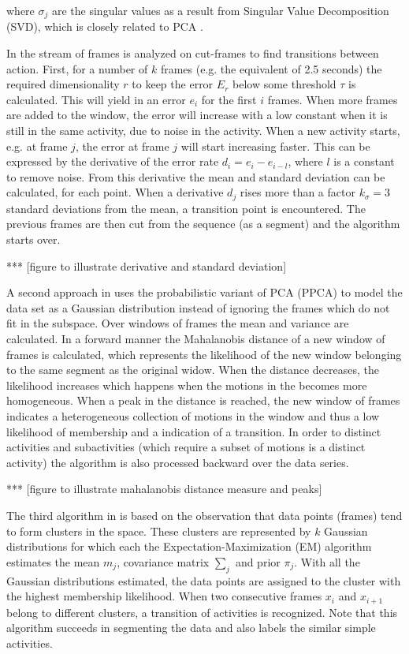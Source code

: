 where $\sigma_j$ are the singular values as a result from Singular Value 
Decomposition (SVD), which is closely related to PCA \cite{shlens2005tutorial}.

In \cite{barbivc2004segmenting} the stream of frames is analyzed on cut-frames 
to find transitions between action. First, for a number of $k$ frames (e.g. 
the 
equivalent of 2.5 seconds) the required dimensionality $r$ to keep the error 
$E_r$ 
below some threshold $\tau$ is calculated. This will yield in an error $e_i$ 
for the first 
$i$ frames. When more frames are added to the window, the error will increase 
with a low constant when it is still in the same activity, due to noise in the 
activity. When a new activity 
starts, e.g. at frame $j$, the error at frame $j$ will start increasing 
faster. This can be expressed by the derivative of the error rate $d_i = e_i - 
e_{i-l}$, where $l$ is a constant to remove noise. From this derivative the 
mean and standard deviation can be calculated, for each point. When a 
derivative $d_j$ rises more than a factor $k_\sigma = 3$ standard deviations 
from the mean, a transition point is encountered. The previous frames are then 
cut from the sequence (as a segment) and the algorithm starts over.

*** [figure to illustrate derivative and standard deviation]

A second approach in \cite{barbivc2004segmenting} uses the probabilistic 
variant of PCA (PPCA) to model the data set as a Gaussian distribution instead 
of ignoring the frames which do not fit in the subspace. Over windows of 
frames the mean and variance are calculated. In a forward manner the 
Mahalanobis distance of a new window of frames is calculated, which represents 
the likelihood of the new window belonging to the same segment as the original 
widow. When the distance decreases, the likelihood increases which happens 
when the motions in the becomes more homogeneous. When a peak in the distance 
is reached, the new window of frames indicates a heterogeneous collection of 
motions in the window and thus a low likelihood of membership and a indication 
of a transition. In order to distinct activities and subactivities (which 
require a subset of motions is a distinct activity) the algorithm is also 
processed backward over the data series.

*** [figure to illustrate mahalanobis distance measure and peaks]

The third algorithm in \cite{barbivc2004segmenting} is based on the 
observation that data points (frames) tend to form clusters in the space. 
These clusters are represented by $k$ Gaussian distributions for which each 
the Expectation-Maximization (EM) algorithm estimates the mean $m_j$, 
covariance matrix $\sum_{j}$ and prior $\pi_j$. With all the Gaussian 
distributions estimated, the data points are assigned to the cluster with the 
highest membership likelihood. When two consecutive frames $x_i$ and $x_{i+1}$ 
belong to different clusters, a transition of activities is recognized. Note 
that this algorithm succeeds in segmenting the data and also labels the 
similar simple activities.

